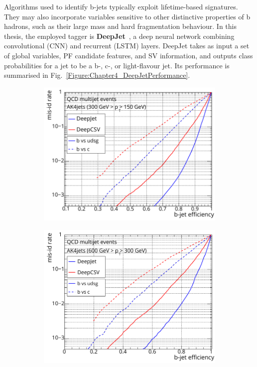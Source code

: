 Algorithms used to identify b-jets typically exploit lifetime-based signatures. They may also incorporate variables sensitive to other distinctive properties of b hadrons, such as their large mass and hard fragmentation behaviour. In this thesis, the employed tagger is \textbf{DeepJet}~\cite{DeepJet}, a deep neural network combining convolutional (CNN) and recurrent (LSTM) layers. DeepJet takes as input a set of global variables, \ac{PF} candidate features, and \ac{SV} information, and outputs class probabilities for a jet to be a b-, c-, or light-flavour jet. Its performance is summarised in Fig.~\ref{Figure:Chapter4_DeepJetPerformance}.

\begin{figure}[h]
    \centering
    \begin{subfigure}[b]{0.49\textwidth}
        \centering
        \includegraphics[width=\textwidth]{Figures/Chapter4/deepJet_lowpt.pdf}
        \caption{}
    \end{subfigure}
    \begin{subfigure}[b]{0.49\textwidth}
        \centering
        \includegraphics[width=\textwidth]{Figures/Chapter4/deepjet_mediumpt.pdf}

\end{subfigure}
\end{figure}
